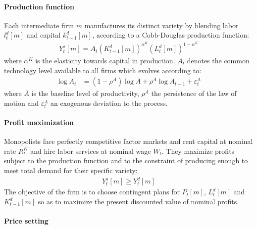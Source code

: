 \paragraph{Production function}
Each intermediate firm \(m\) manufactures its distinct variety by blending labor \(l^{d}_{t}[m]\) and capital \(k^{d}_{t-1}[m]\),
  according to a Cobb-Douglas production function:
\begin{align}
Y^{s}_{t}[m] = A_{t} {(K^{d}_{t-1}[m])}^{\alpha^{K}} {(L^{d}_{t}[m])}^{1-\alpha^{K}} \label{eq:NewKeynesian.IntermediateFirms.ProductionFunction}
\end{align}
where \(\alpha^{K}\) is the elasticity towards capital in production.
\(A_{t}\) denotes the common technology level available to all firms which evolves according to:
\begin{align}
\log{A_{t}} &= (1-\rho^{A}) \log{\overline{A}} + \rho^{A} \log{A_{t-1}} + \varepsilon^{A}_{t} \label{eq:NewKeynesian.LoM.TFP}
\end{align}
where \(\overline{A}\) is the baseline level of productivity,
  \(\rho^{A}\) the persistence of the law of motion
  and \(\varepsilon^{A}_{t}\) an exogenous deviation to the process.

\paragraph{Profit maximization}
Monopolists face perfectly competitive factor markets and
  rent capital at nominal rate \(R^{K}_{t}\)
  and hire labor services at nominal wage \(W_{t}\).
They maximize profits subject to the production function
  and to the constraint of producing enough to meet total demand for their specific variety:
\begin{align*}
Y^{s}_{t}[m] \geq Y^{d}_{t}[m]
\end{align*}
The objective of the firm is to choose contingent plans for \(P_{t}[m]\), \(L^{d}_{t}[m]\) and \(K^{d}_{t-1}[m]\)
  so as to maximize the present discounted value of nominal profits.

\paragraph{Price setting}

